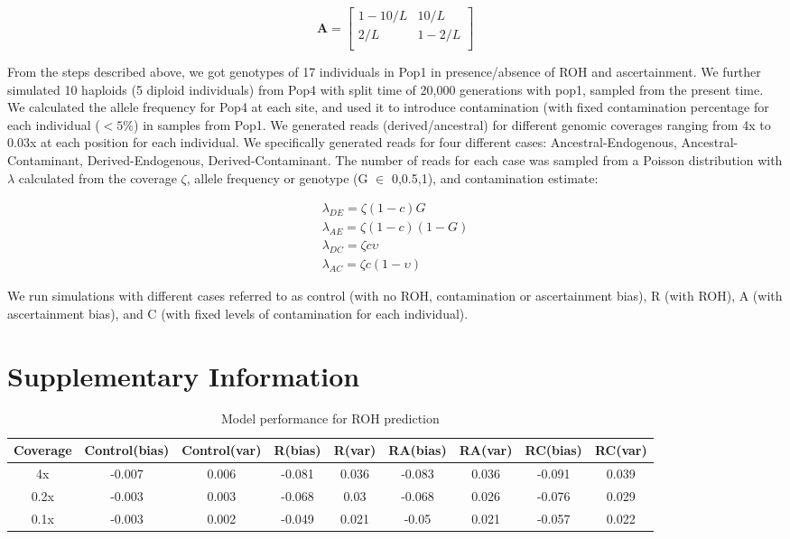\documentclass[12pt, letterpaper]{article}
\begin{document}
$$\mathbf{A} = \left[\begin{array}
{rr}
1-10/L & 10/L \\
2/L & 1-2/L  \\
\end{array}\right]
$$

From the steps described above, we got genotypes of 17 individuals in Pop1 in presence/absence of ROH and ascertainment. We further simulated 10 haploids (5 diploid individuals) from Pop4 with split time of 20,000 generations with pop1, sampled from the present time. We calculated the allele frequency for Pop4 at each site, and used it to introduce contamination (with fixed contamination percentage for each individual ($<5\%$) in samples from Pop1. We generated reads (derived/ancestral) for different genomic coverages ranging from 4x to 0.03x at each position for each individual. We specifically generated reads for four different cases: Ancestral-Endogenous, Ancestral-Contaminant, Derived-Endogenous, Derived-Contaminant. The number of reads for each case was sampled from a Poisson distribution with $\lambda$ calculated from the coverage $\zeta$, allele frequency or genotype (G $\in$ 0,0.5,1), and contamination estimate:

\begin{align}
    \lambda_{DE} = \zeta (1-c) G\nonumber\\
    \lambda_{AE} = \zeta (1-c) (1-G)\nonumber\\
    \lambda_{DC} = \zeta c \upsilon\nonumber\\
    \lambda_{AC} = \zeta c (1-\upsilon)
\end{align}

We run simulations with different cases referred to as control (with no ROH, contamination or ascertainment bias), R (with ROH), A (with ascertainment bias), and C (with fixed levels of contamination for each individual). 

\section{Supplementary Information}



\begin{table}
\caption{\label{tab:Table 2}Model performance for ROH prediction}
\begin{tabular}{|c|c|c|c|c|c|c|c|c|}
    \hline
    Coverage & Control(bias) & Control(var) & R(bias) & R(var) & RA(bias) & RA(var) & RC(bias) & RC(var)\\
    \hline
    4x & -0.007 & 0.006 & -0.081 & 0.036 & -0.083 & 0.036 & -0.091 & 0.039\\
    \hline
    0.2x & -0.003 & 0.003 & -0.068 & 0.03 & -0.068 & 0.026 & -0.076 & 0.029\\
    \hline
    0.1x & -0.003 & 0.002 & -0.049 & 0.021 & -0.05 & 0.021 & -0.057 & 0.022\\
    \hline
\end{tabular}
\label{table1}
\end{table}
\end{document}
